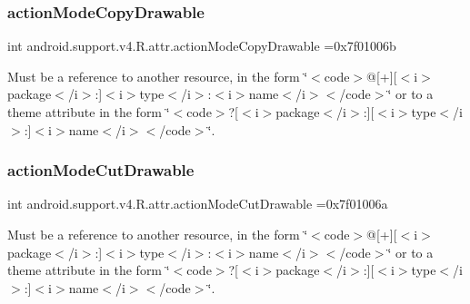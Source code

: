 \subsubsection{\texorpdfstring{action\+Mode\+Copy\+Drawable}{actionModeCopyDrawable}}
{\footnotesize\ttfamily int android.\+support.\+v4.\+R.\+attr.\+action\+Mode\+Copy\+Drawable =0x7f01006b\hspace{0.3cm}{\ttfamily [static]}}

Must be a reference to another resource, in the form \char`\"{}$<$code$>$@\mbox{[}+\mbox{]}\mbox{[}$<$i$>$package$<$/i$>$\+:\mbox{]}$<$i$>$type$<$/i$>$\+:$<$i$>$name$<$/i$>$$<$/code$>$\char`\"{} or to a theme attribute in the form \char`\"{}$<$code$>$?\mbox{[}$<$i$>$package$<$/i$>$\+:\mbox{]}\mbox{[}$<$i$>$type$<$/i$>$\+:\mbox{]}$<$i$>$name$<$/i$>$$<$/code$>$\char`\"{}. \mbox{\label{classandroid_1_1support_1_1v4_1_1R_1_1attr_a153c359f53156ef6f6c8cbdae115e970}} 
\subsubsection{\texorpdfstring{action\+Mode\+Cut\+Drawable}{actionModeCutDrawable}}
{\footnotesize\ttfamily int android.\+support.\+v4.\+R.\+attr.\+action\+Mode\+Cut\+Drawable =0x7f01006a\hspace{0.3cm}{\ttfamily [static]}}

Must be a reference to another resource, in the form \char`\"{}$<$code$>$@\mbox{[}+\mbox{]}\mbox{[}$<$i$>$package$<$/i$>$\+:\mbox{]}$<$i$>$type$<$/i$>$\+:$<$i$>$name$<$/i$>$$<$/code$>$\char`\"{} or to a theme attribute in the form \char`\"{}$<$code$>$?\mbox{[}$<$i$>$package$<$/i$>$\+:\mbox{]}\mbox{[}$<$i$>$type$<$/i$>$\+:\mbox{]}$<$i$>$name$<$/i$>$$<$/code$>$\char`\"{}. \mbox{\label{classandroid_1_1support_1_1v4_1_1R_1_1attr_a63d2cf699ee588f2dd1e167ad656db83}} 
